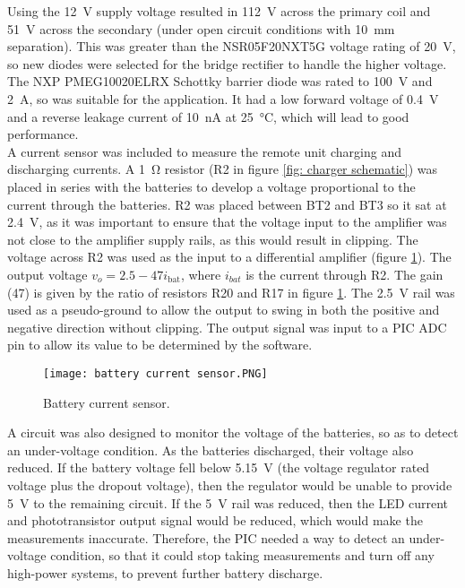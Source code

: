 Using the \SI{12}{\volt} supply voltage resulted in \SI{112}{\volt} across the primary coil and \SI{51}{\volt} across the secondary (under open circuit conditions with \SI{10}{\milli\metre} separation). This was greater than the NSR05F20NXT5G voltage rating of \SI{20}{\volt}, so new diodes were selected for the bridge rectifier to handle the higher voltage. The NXP PMEG10020ELRX Schottky barrier diode \cite{new_diode} was rated to \SI{100}{\volt} and \SI{2}{\ampere}, so was suitable for the application. It had a low forward voltage of \SI{0.4}{\volt} and a reverse leakage current of \SI{10}{\nano\ampere} at \SI{25}{\celsius}, which will lead to good performance.\\


A current sensor was included to measure the remote unit charging and discharging currents. A \SI{1}{\ohm} resistor (R2 in figure \ref{fig: charger schematic}) was placed in series with the batteries to develop a voltage proportional to the current through the batteries. R2 was placed between BT2 and BT3 so it sat at \SI{2.4}{\volt}, as it was important to ensure that the voltage input to the amplifier was not close to the amplifier supply rails, as this would result in clipping. The voltage across R2 was used as the input to a differential amplifier (figure \ref{fig: battery current sensor}). The output voltage $v_o = 2.5 - 47 i_\text{bat}$, where $i_{bat}$ is the current through R2. The gain (47) is given by the ratio of resistors R20 and R17 in figure \ref{fig: battery current sensor}. The \SI{2.5}{\volt} rail was used as a pseudo-ground to allow the output to swing in both the positive and negative direction without clipping. The output signal was input to a PIC ADC pin to allow its value to be determined by the software.\\

\begin{figure}[ht]
	\centering
	\texttt{[image: battery current sensor.PNG]}
	\caption{Battery current sensor.}
	\label{fig: battery current sensor}
\end{figure}

A circuit was also designed to monitor the voltage of the batteries, so as to detect an under-voltage condition. As the batteries discharged, their voltage also reduced. If the battery voltage fell below \SI{5.15}{\volt} (the voltage regulator rated voltage plus the dropout voltage), then the regulator would be unable to provide \SI{5}{\volt} to the remaining circuit. If the \SI{5}{\volt} rail was reduced, then the LED current and phototransistor output signal would be reduced, which would make the measurements inaccurate. Therefore, the PIC needed a way to detect an under-voltage condition, so that it could stop taking measurements and turn off any high-power systems, to prevent further battery discharge.\\

